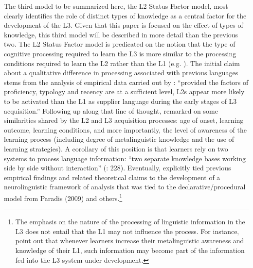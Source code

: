 \documentclass[output=paper,modfonts,nonflat,newtxmath]{langsci/langscibook}
\begin{document}
The third model to be summarized here, the L2 Status Factor model, most clearly identifies the role of distinct types of knowledge as a central factor for the development of the L3. Given that this paper is focused on the effect of types of knowledge, this third model will be described in more detail than the previous two. The L2 Status Factor model is predicated on the notion that the type of cognitive processing required to learn the L3 is more similar to the processing conditions required to learn the L2 rather than the L1 (e.g. \citealt{WilliamsHammarberg1998, BardelFalk2007, FalkBardel2011, BardelSánchez2017}). The initial claim about a qualitative difference in processing associated with previous languages stems from the analysis of empirical data carried out by \citet[323]{WilliamsHammarberg1998}: “provided the factors of proficiency, typology and recency are at a sufficient level, L2s appear more likely to be activated than the L1 as supplier language during the early stages of L3 acquisition.” Following up along that line of thought, \citet{FalkBardel2011} remarked on some similarities shared by the L2 and L3 acquisition processes: age of onset, learning outcome, learning conditions, and more importantly, the level of awareness of the learning process (including degree of metalinguistic knowledge and the use of learning strategies). A corollary of this position is that learners rely on two systems to process language information: “two separate knowledge bases working side by side without interaction” (\citealt{FalkEtAl2015}:  228). Eventually, \citet{BardelFalk2012} explicitly tied previous empirical findings and related theoretical claims to the development of a neurolinguistic framework of analysis that was tied to the declarative/procedural model from Paradis (2009) and others.\footnote{The emphasis on the nature of the processing of linguistic information in the L3 does not entail that the L1 may not influence the process. For instance, \citet{FalkEtAl2015} point out that whenever learners increase their metalinguistic awareness and knowledge of their L1, such information may become part of the information fed into the L3 system under development.}
\end{document}
